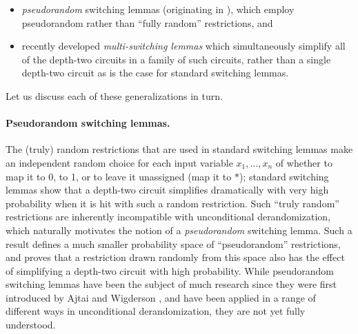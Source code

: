 \documentclass{toc}
\theoremstyle{plain}
\begin{document}
\begin{itemize}

\item [(i)] \emph{pseudorandom} switching lemmas (originating in \cite{AjtaiWigderson:85}), which employ pseudorandom rather than ``fully random'' restrictions, and 

\item [(ii)] recently developed \emph{multi-switching lemmas} \cite{IMP12,Has14} which simultaneously simplify all of the depth-two circuits in a family of such circuits, rather than a single depth-two circuit as is the case for standard switching lemmas.

\end{itemize}

Let us discuss each of these generalizations in turn.


\vspace{-5pt}
\paragraph{Pseudorandom switching lemmas.}  The (truly) random 
restrictions that are used in standard switching lemmas make 
%
%
%
%
%
an independent  %
random choice for each input variable $x_1,\dots,x_n$ of whether to map it to 0, to 1, or to leave it unassigned (map it to $\ast$); standard switching lemmas show that a depth-two circuit simplifies dramatically with very high probability when it is hit with such a random restriction.  Such ``truly random'' restrictions are inherently incompatible with unconditional derandomization, which naturally motivates the notion of a \emph{pseudorandom} switching lemma.  Such a result defines a much smaller probability space of ``pseudorandom'' restrictions, and proves that a restriction drawn randomly from this space also has the effect of simplifying a depth-two circuit with high probability.   While pseudorandom switching lemmas have been the subject of much research since they were first introduced by Ajtai and Wigderson \cite{AjtaiWigderson:85,Ajt93,CR96,AAIPR01,GMRTV12,IMP12,GMR13,TX13,GW14}, and have been applied in a range of different ways in unconditional derandomization, they are not yet fully understood.
\end{document}
